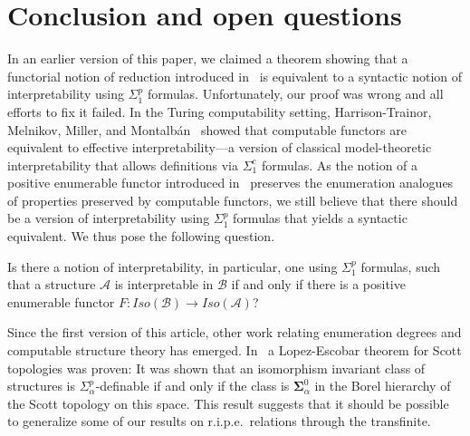 \documentclass[11pt]{amsart}
\newcommand{\A}{{\mathcal{A}}}
\newcommand{\B}{{\mathcal{B}}}
\begin{document}
\section{Conclusion and open questions}
In an earlier version of this paper, we claimed a theorem showing that a functorial notion of reduction introduced in~\cite{CsimaRY21} is equivalent to a syntactic notion of interpretability using $\Sigma^p_1$ formulas. Unfortunately, our proof was wrong and all efforts to fix it failed. In the Turing computability setting, Harrison-Trainor, Melnikov, Miller, and Montalbán~\cite{HTMMM2015} showed that computable functors are equivalent to effective interpretability---a version of classical model-theoretic interpretability that allows definitions via $\Sigma^c_1$ formulas. As the notion of a positive enumerable functor introduced in~\cite{CsimaRY21} preserves the enumeration analogues of properties preserved by computable functors, we still believe that there should be a version of interpretability using $\Sigma^p_1$ formulas that yields a syntactic equivalent. We thus pose the following question.
\begin{question}
Is there a notion of interpretability, in particular, one using $\Sigma^p_1$ formulas, such that a structure $\A$ is interpretable in $\B$ if and only if there is a positive enumerable functor $F:Iso(\B)\to Iso(\A)$?
\end{question}
Since the first version of this article, other work relating enumeration degrees and computable structure theory has emerged. In~\cite{bazhenov2023} a Lopez-Escobar theorem for Scott topologies was proven: It was shown that an isomorphism invariant class of structures is $\Sigma^p_\alpha$-definable if and only if the class is $\pmb\Sigma^0_\alpha$ in the Borel hierarchy of the Scott topology on this space. This result suggests that it should be possible to generalize some of our results on r.i.p.e.\ relations through the transfinite.
\printbibliography
\end{document}
